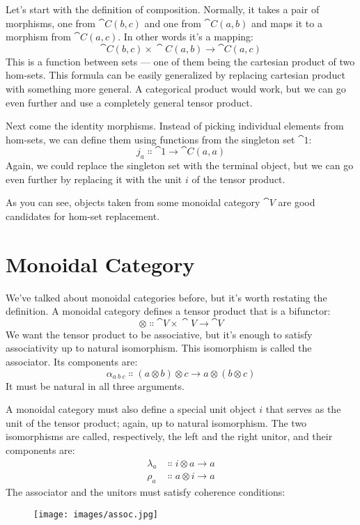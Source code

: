 Let's start with the definition of composition. Normally, it takes a
pair of morphisms, one from $\cat{C}(b, c)$ and one from
$\cat{C}(a, b)$ and maps it to a morphism from $\cat{C}(a, c)$. In
other words it's a mapping:
\[\cat{C}(b, c)\times{}\cat{C}(a, b) \to \cat{C}(a, c)\]
This is a function between sets --- one of them being the cartesian
product of two hom-sets. This formula can be easily generalized by
replacing cartesian product with something more general. A categorical
product would work, but we can go even further and use a completely
general tensor product.

Next come the identity morphisms. Instead of picking individual elements
from hom-sets, we can define them using functions from the singleton set
$\cat{1}$:
\[j_a \Colon \cat{1} \to \cat{C}(a, a)\]
Again, we could replace the singleton set with the terminal object, but
we can go even further by replacing it with the unit $i$ of the
tensor product.

As you can see, objects taken from some monoidal category $\cat{V}$ are
good candidates for hom-set replacement.

\section{Monoidal Category}

We've talked about monoidal categories before, but it's worth restating
the definition. A monoidal category defines a tensor product that is a
bifunctor:
\[\otimes \Colon \cat{V}\times{}\cat{V} \to \cat{V}\]
We want the tensor product to be associative, but it's enough to satisfy
associativity up to natural isomorphism. This isomorphism is called the
associator. Its components are:
\[\alpha_{a\ b\ c} \Colon (a \otimes b) \otimes c \to a \otimes (b \otimes c)\]
It must be natural in all three arguments.

A monoidal category must also define a special unit object $i$
that serves as the unit of the tensor product; again, up to natural
isomorphism. The two isomorphisms are called, respectively, the left and
the right unitor, and their components are:
\begin{align*}
\lambda_a &\Colon i \otimes a \to a \\
\rho_a &\Colon a \otimes i \to a
\end{align*}
The associator and the unitors must satisfy coherence conditions:

\begin{figure}[H]
\centering
\texttt{[image: images/assoc.jpg]}
\end{figure}

